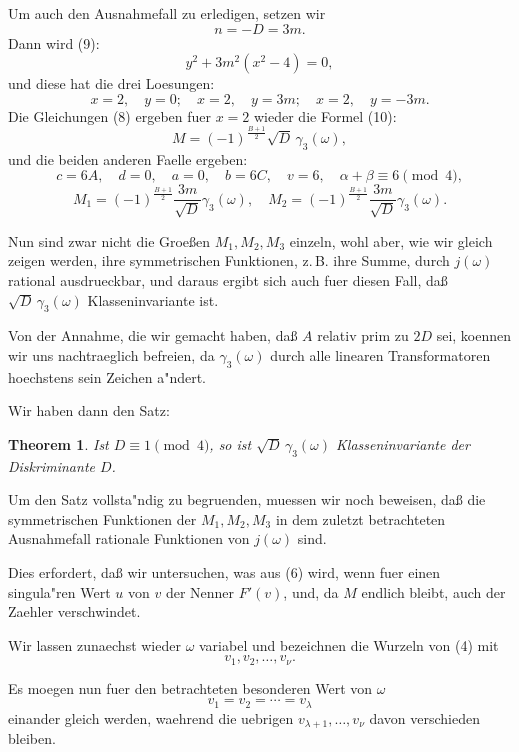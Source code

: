 \documentclass[12pt,a4paper]{article}
\theoremstyle{plain}
\newtheorem{theorem}{Theorem}[section]
\theoremstyle{definition}
\theoremstyle{remark}
\begin{document}
Um auch den Ausnahmefall zu erledigen, setzen wir
\[
n = -D = 3m.
\]
Dann wird (9):
\[
y^2 + 3m^2(x^2 - 4) = 0,
\]
und diese hat die drei Loesungen:
\[
x = 2, \quad y = 0; \quad x = 2, \quad y = 3m; \quad x = 2, \quad y = -3m.
\]
Die Gleichungen (8) ergeben fuer $x = 2$ wieder die Formel (10):
\[
M = (-1)^{\frac{B+1}{2}} \sqrt{D}\, \gamma_3(\omega),
\]
und die beiden anderen Faelle ergeben:
\[
c = 6A, \quad d = 0, \quad a = 0, \quad b = 6C, \quad v = 6, \quad \alpha + \beta \equiv 6 \pmod{4},
\]
\[
M_1 = (-1)^{\frac{B+1}{2}} \frac{3m}{\sqrt{D}} \gamma_3(\omega), \quad M_2 = (-1)^{\frac{B+1}{2}} \frac{3m}{\sqrt{D}} \gamma_3(\omega).
\]

Nun sind zwar nicht die Groe\ss{}en $M_1, M_2, M_3$ einzeln, wohl aber, wie wir gleich zeigen werden, ihre symmetrischen Funktionen, z.\,B. ihre Summe, durch $j(\omega)$ rational ausdrueckbar, und daraus ergibt sich auch fuer diesen Fall, da\ss{} $\sqrt{D}\, \gamma_3(\omega)$ Klasseninvariante ist.

Von der Annahme, die wir gemacht haben, da\ss{} $A$ relativ prim zu $2D$ sei, koennen wir uns nachtraeglich befreien, da $\gamma_3(\omega)$ durch alle linearen Transformatoren hoechstens sein Zeichen a"ndert.

Wir haben dann den Satz:

\begin{theorem}
Ist $D \equiv 1 \pmod{4}$, so ist $\sqrt{D}\, \gamma_3(\omega)$ Klasseninvariante der Diskriminante $D$.
\end{theorem}

Um den Satz vollsta"ndig zu begruenden, muessen wir noch beweisen, da\ss{} die symmetrischen Funktionen der $M_1, M_2, M_3$ in dem zuletzt betrachteten Ausnahmefall rationale Funktionen von $j(\omega)$ sind.

Dies erfordert, da\ss{} wir untersuchen, was aus (6) wird, wenn fuer einen singula"ren Wert $u$ von $v$ der Nenner $F'(v)$, und, da $M$ endlich bleibt, auch der Zaehler verschwindet.

Wir lassen zunaechst wieder $\omega$ variabel und bezeichnen die Wurzeln von (4) mit
\begin{equation}\label{eq:134_11}
v_1, v_2, \ldots, v_\nu.
\end{equation}

Es moegen nun fuer den betrachteten besonderen Wert von $\omega$
\begin{equation}\label{eq:134_12}
v_1 = v_2 = \cdots = v_\lambda
\end{equation}
einander gleich werden, waehrend die uebrigen $v_{\lambda+1}, \ldots, v_\nu$ davon verschieden bleiben.
\end{document}
